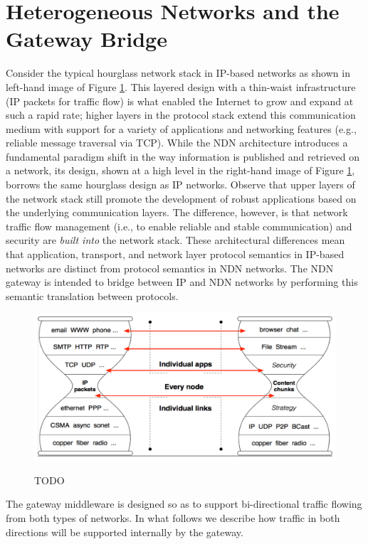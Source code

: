 \section{Heterogeneous Networks and the Gateway Bridge}
Consider the typical hourglass network stack in IP-based networks as shown in left-hand image of Figure \ref{fig:hourglass}. This layered design with a thin-waist infrastructure (IP packets for traffic flow) is what enabled the Internet to grow and expand at such a rapid rate; higher layers in the protocol stack extend this communication medium with support for a variety of applications and networking features (e.g., reliable message traversal via TCP). While the NDN architecture introduces a fundamental paradigm shift in the way information is published and retrieved on a network, its design, shown at a high level in the right-hand image of Figure \ref{fig:hourglass}, borrows the same hourglass design as IP networks. Observe that upper layers of the network stack still promote the development of robust applications based on the underlying communication layers. The difference, however, is that network traffic flow management (i.e., to enable reliable and stable communication) and security are \emph{built into} the network stack. These architectural differences mean that application, transport, and network layer protocol semantics in IP-based networks are distinct from protocol semantics in NDN networks. The NDN gateway is intended to bridge between IP and NDN networks by performing this semantic translation between protocols. 

\begin{figure}
\begin{center}
\includegraphics[scale=0.5]{./images/hourglass_conn.pdf}
\label{fig:hourglass}
\caption{TODO}
\end{center}
\end{figure}

The gateway middleware is designed so as to support bi-directional traffic flowing from both types of networks. In what follows we describe how traffic in both directions will be supported internally by the gateway.

